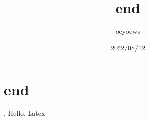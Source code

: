 \documentclass[UTF8]{article}
\title{end \emoji{rocket}}
\author{oeyoews}
\date{2022/08/12}
\begin{document}
\maketitle

\section{end }%
\label{sec:emoji}

, Hello, Latex
\end{document}

